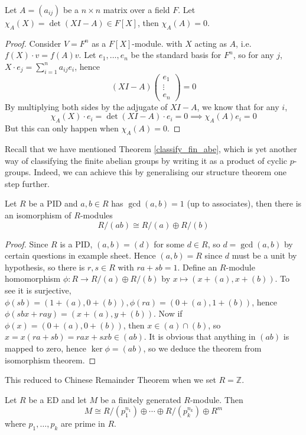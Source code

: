 \begin{theorem}
    Let $A=(a_{ij})$ be a $n\times n$ matrix over a field $F$.
    Let $\chi_A(X)=\det (XI-A)\in F[X]$, then $\chi_A(A)=0$.
\end{theorem}
\begin{proof}
    Consider $V=F^n$ as a $F[X]$-module. with $X$ acting as $A$, i.e. $f(X)\cdot v=f(A)v$.
    Let $e_1,\ldots,e_n$ be the standard basis for $F^n$, so for any $j$, $X\cdot e_j=\sum_{i=1}^na_{ij}e_i$, hence
    $$(XI-A)\begin{pmatrix}
        e_1\\
        \vdots\\
        e_n
    \end{pmatrix}=0$$
    By multiplying both sides by the adjugate of $XI-A$, we know that for any $i$,
    $$\chi_A(X)\cdot e_i=\det(XI-A)\cdot e_i=0\implies\chi_A(A)e_i=0$$
    But this can only happen when $\chi_A(A)=0$.
\end{proof}
Recall that we have mentioned Theorem \ref{classify_fin_abe}, which is yet another way of classifying the finite abelian groups by writing it as a product of cyclic $p$-groups.
Indeed, we can achieve this by generalising our structure theorem one step further.
\begin{lemma}
    Let $R$ be a PID and $a,b\in R$ has $\gcd(a,b)=1$ (up to associates), then there is an isomorphism of $R$-modules
    $$R/(ab)\cong R/(a)\oplus R/(b)$$
\end{lemma}
\begin{proof}
    Since $R$ is a PID, $(a,b)=(d)$ for some $d\in R$, so $d=\gcd(a,b)$ by certain questions in example sheet.
    Hence $(a,b)=R$ since $d$ must be a unit by hypothesis, so there is $r,s\in R$ with $ra+sb=1$.
    Define an $R$-module homomorphism $\phi:R\to R/(a)\oplus R/(b)$ by $x\mapsto (x+(a),x+(b))$.
    To see it is surjective, $\phi(sb)=(1+(a),0+(b)),\phi(ra)=(0+(a),1+(b))$, hence $\phi(sbx+ray)=(x+(a),y+(b))$.
    Now if $\phi(x)=(0+(a),0+(b))$, then $x\in (a)\cap(b)$, so $x=x(ra+sb)=rax+sxb\in (ab)$.
    It is obvious that anything in $(ab)$ is mapped to zero, hence $\ker\phi=(ab)$, so we deduce the theorem from isomorphism theorem.
\end{proof}
This reduced to Chinese Remainder Theorem when we set $R=\mathbb Z$.
\begin{theorem}\label{prime_decomp}
    Let $R$ be a ED and let $M$ be a finitely generated $R$-module.
    Then
    $$M\cong R/(p_1^{n_1})\oplus\cdots\oplus R/(p_k^{n_k})\oplus R^m$$
    where $p_1,\ldots,p_k$ are prime in $R$.
\end{theorem}
